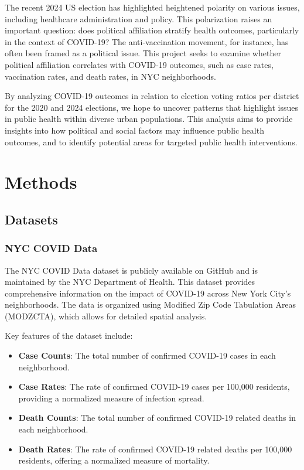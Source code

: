 \documentclass[10pt,journal,compsoc]{IEEEtran}
\begin{document}
The recent 2024 US election has highlighted heightened polarity on various issues, including healthcare administration and policy. This polarization raises an important question: does political affiliation stratify health outcomes, particularly in the context of COVID-19? The anti-vaccination movement, for instance, has often been framed as a political issue. This project seeks to examine whether political affiliation correlates with COVID-19 outcomes, such as case rates, vaccination rates, and death rates, in NYC neighborhoods.

By analyzing COVID-19 outcomes in relation to election voting ratios per district for the 2020 and 2024 elections, we hope to uncover patterns that highlight issues in public health within diverse urban populations. This analysis aims to provide insights into how political and social factors may influence public health outcomes, and to identify potential areas for targeted public health interventions.


\section{Methods}
\subsection{Datasets}
\subsubsection{NYC COVID Data}

The NYC COVID Data dataset \cite{coviddatanyc} is publicly available on GitHub and is maintained by the NYC Department of Health. This dataset provides comprehensive information on the impact of COVID-19 across New York City's neighborhoods. The data is organized using Modified Zip Code Tabulation Areas (MODZCTA), which allows for detailed spatial analysis.

Key features of the dataset include:
\begin{itemize}
    \item \textbf{Case Counts}: The total number of confirmed COVID-19 cases in each neighborhood.
    \item \textbf{Case Rates}: The rate of confirmed COVID-19 cases per 100,000 residents, providing a normalized measure of infection spread.
    \item \textbf{Death Counts}: The total number of confirmed COVID-19 related deaths in each neighborhood.
    \item \textbf{Death Rates}: The rate of confirmed COVID-19 related deaths per 100,000 residents, offering a normalized measure of mortality.
\end{itemize}
\end{document}
